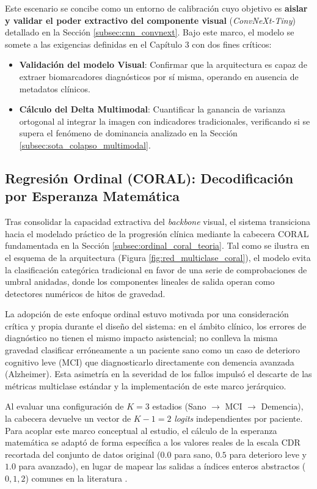 \documentclass[12pt, oneside, english, spanish]{book}
\begin{document}
Este escenario se concibe como un entorno de calibración cuyo objetivo es \textbf{aislar y validar el poder extractivo del componente visual} (\textit{ConvNeXt-Tiny}) detallado en la Sección \ref{subsec:cnn_convnext}. Bajo este marco, el modelo se somete a las exigencias definidas en el Capítulo 3 con dos fines críticos:
\begin{itemize}
	\item \textbf{Validación del modelo Visual}: Confirmar que la arquitectura es capaz de extraer biomarcadores diagnósticos por sí misma, operando en ausencia de metadatos clínicos.
	\item \textbf{Cálculo del Delta Multimodal}: Cuantificar la ganancia de varianza ortogonal al integrar la imagen con indicadores tradicionales, verificando si se supera el fenómeno de dominancia analizado en la Sección \ref{subsec:sota_colapso_multimodal}.
\end{itemize}

\subsection{Regresión Ordinal (CORAL): Decodificación por Esperanza Matemática} \label{subsec:regresion_coral}

Tras consolidar la capacidad extractiva del \textit{backbone} visual, el sistema transiciona hacia el modelado práctico de la progresión clínica mediante la cabecera CORAL fundamentada en la Sección \ref{subsec:ordinal_coral_teoria}. Tal como se ilustra en el esquema de la arquitectura (Figura \ref{fig:red_multiclase_coral}), el modelo evita la clasificación categórica tradicional en favor de una serie de comprobaciones de umbral anidadas, donde los componentes lineales de salida operan como detectores numéricos de hitos de gravedad.

La adopción de este enfoque ordinal estuvo motivada por una consideración crítica y propia durante el diseño del sistema: en el ámbito clínico, los errores de diagnóstico no tienen el mismo impacto asistencial; no conlleva la misma gravedad clasificar erróneamente a un paciente sano como un caso de deterioro cognitivo leve (MCI) que diagnosticarlo directamente con demencia avanzada (Alzheimer). Esta asimetría en la severidad de los fallos impulsó el descarte de las métricas multiclase estándar y la implementación de este marco jerárquico.

Al evaluar una configuración de $K=3$ estadios (Sano $\rightarrow$ MCI $\rightarrow$ Demencia), la cabecera devuelve un vector de $K-1 = 2$ \textit{logits} independientes por paciente. Para acoplar este marco conceptual al estudio, el cálculo de la esperanza matemática se adaptó de forma específica a los valores reales de la escala CDR recortada del conjunto de datos original ($0.0$ para sano, $0.5$ para deterioro leve y $1.0$ para avanzado), en lugar de mapear las salidas a índices enteros abstractos ($0, 1, 2$) comunes en la literatura \cite{cao2020rank}. 
\end{document}
